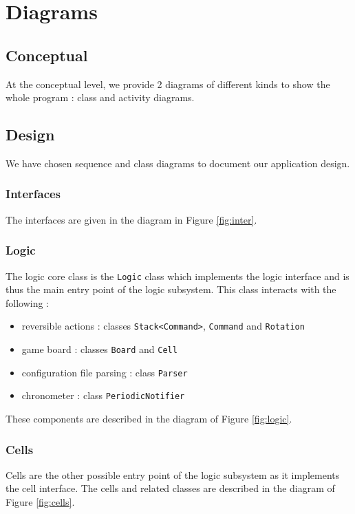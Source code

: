 \documentclass[a4paper,11pt]{article}
\begin{document}
\section{Diagrams}
\label{sec:diagrams}
	
	\subsection{Conceptual}

At the conceptual level, we provide 2 diagrams of different kinds to show the whole program : class and activity diagrams.

\paragraph{}





\subsection{Design}
We have chosen sequence and class diagrams to document our application design. 
\subsubsection{Interfaces}
The interfaces are given in the diagram in Figure \ref{fig:inter}.
\subsubsection{Logic}
The logic core class is the \texttt{Logic} class which implements the logic interface and is thus the main entry point of the logic subsystem. This class interacts with the following :
\begin{itemize}
	\item reversible actions : classes \texttt{Stack<Command>}, \texttt{Command} and \texttt{Rotation} 
	\item game board : classes \texttt{Board} and \texttt{Cell}
	\item configuration file parsing : class \texttt{Parser}
	\item chronometer : class \texttt{PeriodicNotifier}
\end{itemize}
These components are described in the diagram of Figure \ref{fig:logic}.
\subsubsection{Cells}
Cells are the other possible entry point of the logic subsystem as it implements the cell interface. The cells and related classes are described in the diagram of Figure \ref{fig:cells}.
\end{document}
